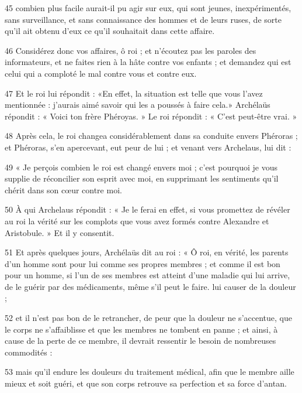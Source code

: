 \par 45 combien plus facile aurait-il pu agir sur eux, qui sont jeunes, inexpérimentés, sans surveillance, et sans connaissance des hommes et de leurs ruses, de sorte qu'il ait obtenu d'eux ce qu'il souhaitait dans cette affaire.

\par 46 Considérez donc vos affaires, ô roi ; et n'écoutez pas les paroles des informateurs, et ne faites rien à la hâte contre vos enfants ; et demandez qui est celui qui a comploté le mal contre vous et contre eux.

\par 47 Et le roi lui répondit : «En effet, la situation est telle que vous l'avez mentionnée : j'aurais aimé savoir qui les a poussés à faire cela.» Archélaüs répondit : « Voici ton frère Phéroyas. » Le roi répondit : « C'est peut-être vrai. »

\par 48 Après cela, le roi changea considérablement dans sa conduite envers Phéroras ; et Phéroras, s'en apercevant, eut peur de lui ; et venant vers Archelaus, lui dit :

\par 49 « Je perçois combien le roi est changé envers moi ; c'est pourquoi je vous supplie de réconcilier son esprit avec moi, en supprimant les sentiments qu'il chérit dans son cœur contre moi.

\par 50 À qui Archelaus répondit : « Je le ferai en effet, si vous promettez de révéler au roi la vérité sur les complots que vous avez formés contre Alexandre et Aristobule. » Et il y consentit.

\par 51 Et après quelques jours, Archélaüs dit au roi : « Ô roi, en vérité, les parents d'un homme sont pour lui comme ses propres membres ; et comme il est bon pour un homme, si l'un de ses membres est atteint d'une maladie qui lui arrive, de le guérir par des médicaments, même s'il peut le faire. lui causer de la douleur ;

\par 52 et il n'est pas bon de le retrancher, de peur que la douleur ne s'accentue, que le corps ne s'affaiblisse et que les membres ne tombent en panne ; et ainsi, à cause de la perte de ce membre, il devrait ressentir le besoin de nombreuses commodités :

\par 53 mais qu'il endure les douleurs du traitement médical, afin que le membre aille mieux et soit guéri, et que son corps retrouve sa perfection et sa force d'antan.

